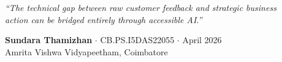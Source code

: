 \documentclass[aspectratio=169]{beamer}
\begin{document}
{\begin{frame}
\begin{center}
\begin{columns}[c]
    \end{columns}
    \vspace{0.4cm}
    \begin{tcolorbox}[colback=white!10, colframe=accentblue!60, arc=6pt, boxrule=0.8pt,
                      width=0.85\textwidth, halign=center]
      \color{iceblue}\small\itshape
      ``The technical gap between raw customer feedback and strategic business\\
       action can be bridged entirely through accessible AI.''
    \end{tcolorbox}
    \vspace{0.25cm}
    {\color{iceblue!80}\small\textbf{Sundara Thamizhan}
      $\cdot$ CB.PS.I5DAS22055 $\cdot$ April 2026}\\
    {\color{iceblue!60}\scriptsize Amrita Vishwa Vidyapeetham, Coimbatore}
  \end{center}
\end{frame}
}
\end{document}
